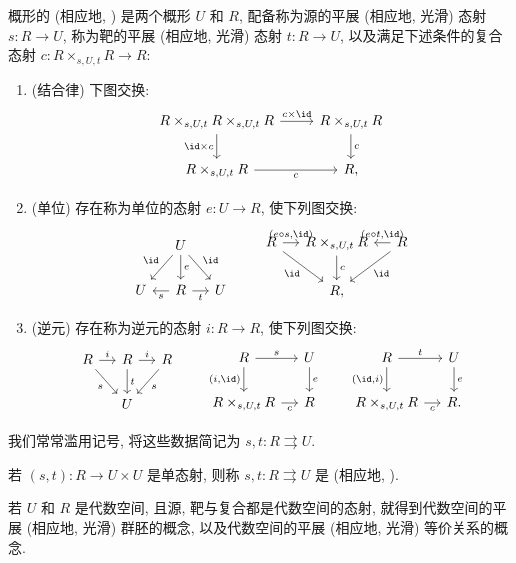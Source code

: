 \begin{definition}\label{src:4.4.1}
概形的 (相应地, ) 是两个概形 $U$ 和 $R$, 配备称为源的平展 (相应地, 光滑) 态射 $s:R\to U$, 称为靶的平展 (相应地, 光滑) 态射 $t:R\to U$, 以及满足下述条件的复合态射 $c:R\times_{s,U,t}R\to R$:
\begin{enumerate}[(1)]
\item (结合律) 下图交换:
\[
\begin{tikzcd}
R\times_{s,U,t}R\times_{s,U,t}R\arrow[r,"c\times\id"]\arrow[d,"\id\times c"']&R\times_{s,U,t}R\arrow[d,"c"]\\
R\times_{s,U,t}R\arrow[r,"c"']&R,
\end{tikzcd}
\]
\item (单位) 存在称为单位的态射 $e:U\to R$, 使下列图交换:
\[
\begin{tikzcd}[column sep=small]
{}&U\arrow[dl,"\id"']\arrow[d,"e"]\arrow[dr,"\id"]&{}\\
U&R\arrow[l,"s"]\arrow[r,"t"']&U
\end{tikzcd}
\qquad
\begin{tikzcd}[column sep=small]
R\arrow[r,"{(e\circ s,\id)}"]\arrow[dr,"\id"']&R\times_{s,U,t}R\arrow[d,"c"]&R\arrow[l,"{(e\circ t,\id)}"']\arrow[dl,"\id"]\\
{}&R,&{}
\end{tikzcd}
\]
\item (逆元) 存在称为逆元的态射 $i:R\to R$, 使下列图交换:
\[
\begin{tikzcd}[column sep=small]
R\arrow[r,"i"]\arrow[dr,"s"']&R\arrow[r,"i"]\arrow[d,"t"]&R\arrow[dl,"s"]\\
{}&U&{}
\end{tikzcd}
\qquad
\begin{tikzcd}[column sep=small]
R\arrow[r,"s"]\arrow[d,"{(i,\id)}"']&U\arrow[d,"e"]\\
R\times_{s,U,t}R\arrow[r,"c"']&R
\end{tikzcd}
\qquad
\begin{tikzcd}[column sep=small]
R\arrow[r,"t"]\arrow[d,"{(\id,i)}"']&U\arrow[d,"e"]\\
R\times_{s,U,t}R\arrow[r,"c"']&R.
\end{tikzcd}
\]
\end{enumerate}
我们常常滥用记号, 将这些数据简记为 $s,t:R\rightrightarrows U$.

若 $(s,t):R\to U\times U$ 是单态射, 则称 $s,t:R\rightrightarrows U$ 是 (相应地, ).

若 $U$ 和 $R$ 是代数空间, 且源, 靶与复合都是代数空间的态射, 就得到代数空间的平展 (相应地, 光滑) 群胚的概念, 以及代数空间的平展 (相应地, 光滑) 等价关系的概念.
\end{definition}
